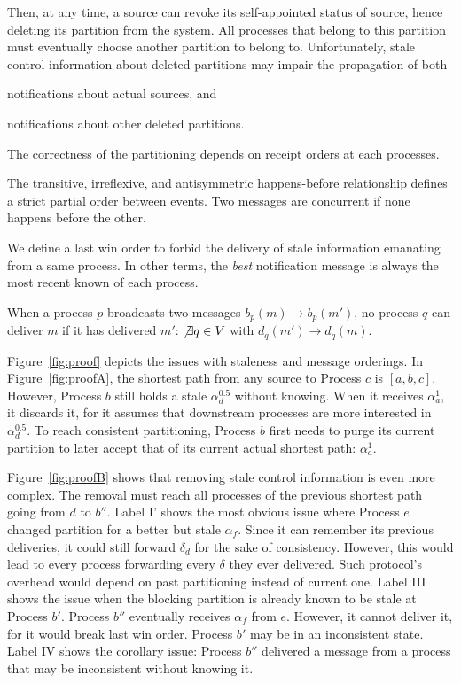 Then, at any time, a source can revoke its self-appointed status of
source, hence deleting its partition from the system. All processes
that belong to this partition must eventually choose another partition
to belong to. Unfortunately, stale control information about deleted
partitions may impair the propagation of both
\begin{inparaenum}[(i)]
\item notifications about actual sources, and
\item notifications about other deleted partitions.
\end{inparaenum}
The correctness of the partitioning depends on receipt orders at each
processes.

\begin{definition}
  The transitive, irreflexive, and antisymmetric happens-before
  relationship defines a strict partial order between events. Two
  messages are concurrent if none happens before the other.
\end{definition}

We define a last win order to forbid the delivery of stale information
emanating from a same process. In other terms, the \emph{best}
notification message is always the most recent known of each process.
 
\begin{definition}
  When a process $p$ broadcasts two messages $b_p(m) \rightarrow
  b_p(m')$, no process $q$ can deliver $m$ if it has delivered $m'$:
  $\not\exists q \in V$ with $d_q(m') \rightarrow d_q(m)$.
\end{definition}

Figure~\ref{fig:proof} depicts the issues with staleness and message
orderings. In Figure~\ref{fig:proofA}, the shortest path from any
source to Process $c$ is $[a, b, c]$. However, Process $b$ still holds
a stale $\alpha_d^{0.5}$ without knowing. When it receives
$\alpha_a^1$, it discards it, for it assumes that downstream processes
are more interested in $\alpha_d^{0.5}$. To reach consistent
partitioning, Process $b$ first needs to purge its current partition
to later accept that of its current actual shortest path:
$\alpha_a^1$.

\noindent Figure~\ref{fig:proofB} shows that removing stale control
information is even more complex. The removal must reach all processes
of the previous shortest path going from $d$ to $b''$. Label I' shows
the most obvious issue where Process $e$ changed partition for a
better but stale $\alpha_f$. Since it can remember its previous
deliveries, it could still forward $\delta_d$ for the sake of
consistency. However, this would lead to every process forwarding
every $\delta$ they ever delivered. Such protocol's overhead would
depend on past partitioning instead of current one. Label III shows
the issue when the blocking partition is already known to be stale at
Process $b'$. Process $b''$ eventually receives $\alpha_f$ from
$e$. However, it cannot deliver it, for it would break last win order.
Process $b'$ may be in an inconsistent state. Label IV shows the
corollary issue: Process $b''$ delivered a message from a process that
may be inconsistent without knowing it.

